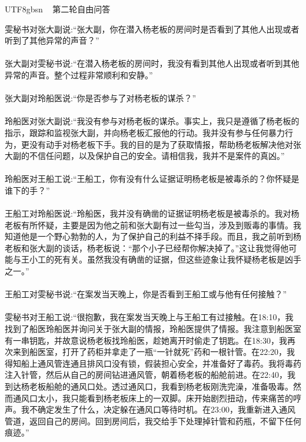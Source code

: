 \documentclass[11pt]{article}
\begin{document}
{\begin{CJK}{UTF8}{gbsn}
\ \raisedrule[.5ex]{1pt} 第二轮自由问答 \raisedrule[.5ex]{1pt} \ 

雯秘书对张大副说:``张大副，你在潜入杨老板的房间时是否看到了其他人出现或者听到了其他异常的声音？''\\ \\
张大副对雯秘书说:``在潜入杨老板的房间时，我没有看到其他人出现或者听到其他异常的声音。整个过程非常顺利和安静。''\\ \\
张大副对玲船医说:``你是否参与了对杨老板的谋杀？''\\ \\
玲船医对张大副说:``我没有参与对杨老板的谋杀。事实上，我只是遵循了杨老板的指示，跟踪和监视张大副，并向杨老板汇报他的行动。我并没有参与任何暴力行为，更没有动手对杨老板下手。我的目的是为了获取情报，帮助杨老板解决他对张大副的不信任问题，以及保护自己的安全。请相信我，我并不是案件的真凶。''\\ \\
玲船医对王船工说:``王船工，你有没有什么证据证明杨老板是被毒杀的？你怀疑是谁下的手？''\\ \\
王船工对玲船医说:``玲船医，我并没有确凿的证据证明杨老板是被毒杀的。我对杨老板有所怀疑，主要是因为他之前和张大副有过一些勾当，涉及到贩毒的事情。我知道他是一个野心勃勃的人，为了保护自己的利益不择手段。而且，我之前听到杨老板和张大副的谈话，杨老板说：“那个小子已经帮你解决掉了。”这让我觉得他可能与王小工的死有关。虽然我没有确凿的证据，但这些迹象让我怀疑杨老板是凶手之一。''\\ \\
王船工对雯秘书说:``在案发当天晚上，你是否看到王船工或与他有任何接触？''\\ \\
雯秘书对王船工说:``很抱歉，我在案发当天晚上与王船工有过接触。在18:10，我找到了船医玲船医并询问关于张大副的情报，玲船医提供了情报。我注意到船医室有一串钥匙，并故意说杨老板找玲船医，趁她离开时偷走了钥匙。在18:30，我再次来到船医室，打开了药柜并拿走了一瓶“一针就死”药和一根针管。在22:20，我得知船上通风管连通且排风口没有锁，假装担心安全，并准备好了毒药。我将毒药注入针管，然后从自己的房间钻进通风管，朝着杨老板的船舱前进。在22:40，我到达杨老板船舱的通风口处。透过通风口，我看到杨老板刚洗完澡，准备吸毒。然而通风口太小，我只能看到杨老板床上的一双脚。床开始剧烈扭动，传来痛苦的哼声。我不确定发生了什么，决定躲在通风口等待时机。在23:00，我重新进入通风管道，返回自己的房间。回到房间后，我交给手下处理掉针管和药瓶，不留下任何痕迹。''\\ \\



\end{CJK}}
\end{document}
